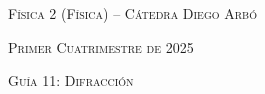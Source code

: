 \documentclass[11pt,spanish]{article}
\begin{document}
    \begin{center}
    \textsc{\large Física 2 (Física) -- Cátedra Diego Arbó}
    \par\end{center}{\large \par}
    
    \begin{center}
    \textsc{\large Primer Cuatrimestre de 2025}
    \par\end{center}{\large \par}
    
    \begin{center}
    \textsc{\large Guía 11: Difracción}
    \par\end{center}{\large \par}
\end{document}
